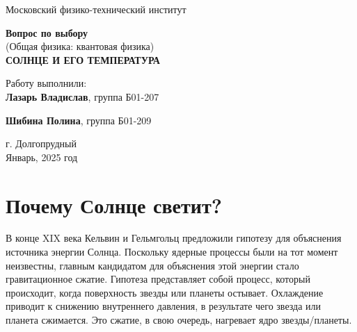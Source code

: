 \documentclass[a4paper,12pt]{article}
\date{}
\begin{document}
\begin{titlepage}
	\begin{center}
		\large 	Московский физико-технический институт \\
		\vspace{0.2cm}
		
		\vspace{4.5cm}
		\LARGE \textbf{Вопрос по выбору} \\ \vspace{0.2cm}
		\large (Общая физика: квантовая физика) \\ \vspace{0.2cm}
		\LARGE \textbf{СОЛНЦЕ И ЕГО ТЕМПЕРАТУРА}
	\end{center}
	\vspace{2.3cm} \large
	
	\begin{center}
		Работу выполнили: \\
        \textbf{Лазарь Владислав}, группа Б01-207
        \vspace{0.3cm}
        
        \textbf{Шибина Полина}, группа Б01-209

	\end{center}
	\begin{center} \vspace{100mm}
		г. Долгопрудный \\
		 Январь, 2025 год
	\end{center}
\end{titlepage}


\section*{Почему Солнце светит?}
 В конце XIX века Кельвин и Гельмгольц предложили гипотезу для объяснения источника энергии Солнца. Поскольку ядерные процессы были на тот момент неизвестны, главным кандидатом для объяснения этой энергии стало гравитационное сжатие. Гипотеза представляет собой процесс, который происходит, когда поверхность звезды или планеты остывает. Охлаждение приводит к снижению внутреннего давления, в результате чего звезда или планета сжимается. Это сжатие, в свою очередь, нагревает ядро звезды/планеты. 
\end{document}
